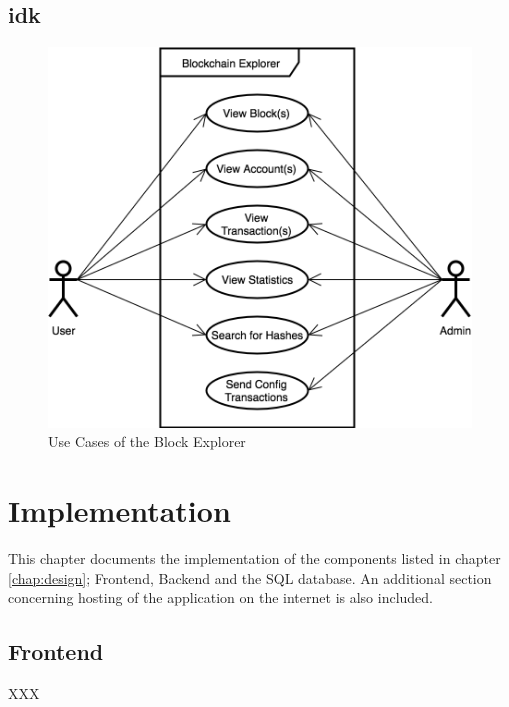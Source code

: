 \section{idk}
\begin{figure}
  \includegraphics[width=\linewidth]{usecase1.png}
  \caption{Use Cases of the Block Explorer}
  \label{fig:usecase1}
\end{figure}

\chapter{Implementation}
This chapter documents the implementation of the components listed in chapter \ref{chap:design}; Frontend, Backend and the SQL database. An additional section concerning hosting of the application on the internet is also included.
\section{Frontend}
XXX
